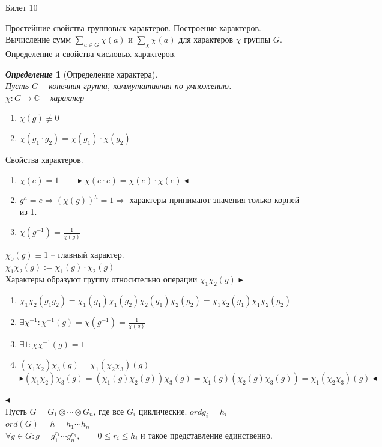 \documentclass[a4paper,12pt]{article}
\newtheorem{deff}{\textit{Определение}}
\newcommand{\ee}{\equiv}
\newcommand{\q}{\quad}
\newcommand{\pb}{\blacktriangleright}
\newcommand{\pe}{\blacktriangleleft}
\newcommand{\Ra}{\Rightarrow}
\newcommand{\bb}[1]{\mathbb{#1}}
\begin{document}
\newpage
\begin{mybox2}{\hypertarget{bil10}{Билет 10}}

\begin{formbox}{}
Простейшие свойства групповых характеров. Построение характеров. Вычисление сумм $\sum_{a\in G} \chi(a)$ и $\sum_\chi \chi(a)$ для характеров $\chi$ группы $G$. Определение и свойства числовых характеров.
\end{formbox}
\begin{formbox}{}
\begin{deff} [Определение характера]\q\\
Пусть $G$ -- конечная группа, коммутативная по умножению.\\
$\chi:G\to\bb{C}$ -- характер
\begin{enumerate}
\item $\chi(g) \not\ee0 $
\item $\chi(g_1 \cdot g_2) = \chi(g_1)\cdot \chi(g_2)  $
\end{enumerate}
\end{deff}
\end{formbox}
Свойства характеров.
\begin{enumerate}
\item $\chi(e) = 1\q\q \pb \chi(e\cdot e) = \chi(e)\cdot \chi(e) \pe$
\item $g^h=e\Ra (\chi(g))^h = 1 \Ra $ характеры принимают значения только корней из 1.
\item $\chi(g^{-1}) = \frac{1}{\chi(g)}$
\end{enumerate}
 $\chi_0(g)\ee 1$ -- главный характер.\\
 $\chi_1 \chi_2 (g):= \chi_1(g)\cdot\chi_2(g)$\\

Характеры образуют группу относительно операции \(\chi_1 \chi_2 (g)\)
$\pb$
\begin{enumerate}
\item $\chi_1\chi_2 (g_1 g_2) = \chi_1(g_1)\chi_1(g_2)\chi_2(g_1)\chi_2(g_2) = \chi_1\chi_2(g_1)\chi_1\chi_2(g_2)$
\item $\exists \chi^{-1}: \chi^{-1}(g) =\chi(g^{-1}) = \frac{1}{\chi(g)}$
\item $\exists 1: \chi\chi^{-1}(g) = 1$
\item $(\chi_1\chi_2)\chi_3 (g) = \chi_1(\chi_2\chi_3) (g)$\\$\pb (\chi_1\chi_2)\chi_3 (g) = (\chi_1(g)\chi_2(g))\chi_3(g) = \chi_1(g)(\chi_2(g)\chi_3(g)) = \chi_1(\chi_2\chi_3) (g)\pe$
\end{enumerate} $\pe$\\
Пусть $G = G_1\otimes \cdots \otimes G_n$, где все $G_i$ циклические. $ord g_i = h_i$\\
$ord (G) = h = h_1\cdots h_n$\\
$\forall g\in G: g = g_1^{r_1}\cdots g_n^{r_n},\q\q 0\le r_i\le h_i$ и такое представление единственно.\\
\end{mybox2}
\end{document}
